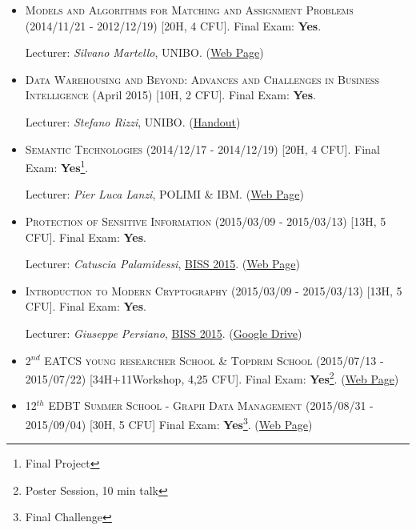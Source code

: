 \begin{itemize}
	
	\setlength\itemsep{1em}
\item \textsc{Models and Algorithms for Matching and Assignment Problems} (2014/11/21 - 2012/12/19) [20H, 4 CFU]. Final Exam: \textbf{Yes}.

Lecturer: \textit{Silvano Martello}, UNIBO.  (\href{http://www.dei.unibo.it/en/teaching/phd/ict/courses/models-and-algorithms-for-matching-and-assignment-problems}{Web Page})


\item \textsc{Data Warehousing and Beyond: Advances and Challenges in Business Intelligence} (April 2015) [10H, 2 CFU]. Final Exam: \textbf{Yes}.

Lecturer: \textit{Stefano Rizzi}, UNIBO. (\href{http://www.informatica.unibo.it/it/risorse/files/programma-business-intelligence-2015}{Handout})


\item \textsc{Semantic Technologies} (2014/12/17 - 2014/12/19) [20H, 4 CFU]. Final Exam: \textbf{Yes}\footnote{Final Project}.

Lecturer: \textit{Pier Luca Lanzi}, POLIMI \& IBM. (\href{https://www11.ceda.polimi.it/manifestidott/manifestidott/controller/MainPublic.do?evn_dettaglioinsegnamento=evento\&aa=2014\&k_corso_la=1330\&lang=IT\&caricaOffertaComune=true\&c_insegn=096877\&jaf_currentWFID=main}{Web Page})


\item \textsc{Protection of Sensitive Information} (2015/03/09 - 2015/03/13) [13H, 5 CFU]. Final Exam: \textbf{Yes}.

Lecturer: \textit{Catuscia Palamidessi}, \href{https://www.cs.unibo.it/projects/biss2015/}{BISS 2015}. (\href{http://www.lix.polytechnique.fr/~catuscia/teaching/Bertinoro2015/}{Web Page})


\item \textsc{Introduction to Modern Cryptography} (2015/03/09 - 2015/03/13) [13H, 5 CFU].  Final Exam: \textbf{Yes}.

Lecturer: \textit{Giuseppe Persiano}, \href{https://www.cs.unibo.it/projects/biss2015/}{BISS 2015}. (\href{https://drive.google.com/drive/u/1/folders/0B3tBL-tX2EdQMHNleklMVWpfNUk}{Google Drive})


\item \textsc{2$^{nd}$ EATCS young researcher School \& Topdrim School} (2015/07/13 - 2015/07/22) [34H+11Workshop, 4,25 CFU]. Final Exam: \textbf{Yes}\footnote{Poster Session, 10 min talk}.  (\href{http://camerino2015.topdrim.eu/}{Web Page})



\item \textsc{12$^{th}$ EDBT Summer School - Graph Data Management} (2015/08/31 - 2015/09/04) [30H, 5 CFU] Final Exam: \textbf{Yes}\footnote{Final Challenge}.  (\href{http://edbt2015school.win.tue.nl/}{Web Page})

\end{itemize}

